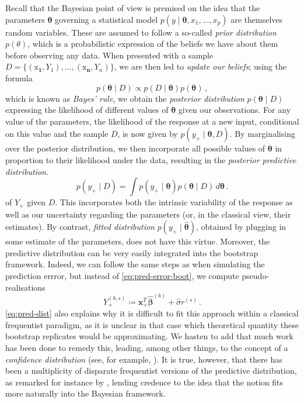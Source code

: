 \documentclass[a4paper]{book}
\begin{document}
Recall that the Bayesian point of view is premised on the idea that the parameters $\bm{\theta}$ governing a statistical model $p(y \mid \bm{\theta}, x_1, \dots, x_p)$ are themselves random variables. These are assumed to follow a so-called \emph{prior distribution} $p(\theta)$, which is a probabilistic expression of the beliefs we have about them before observing any data. When presented with a sample $D = \{ (\bm{\mathrm{x}_1}, Y_1), \dots, (\bm{\mathrm{x}_n}, Y_n) \}$, we are then led to \emph{update our beliefs}; using the formula
\begin{equation}
  p(\bm{\theta} \mid D) \propto p(D \mid \bm{\theta}) p(\bm{\theta}) \,,
\end{equation}
which is known as \emph{Bayes' rule}, we obtain the \emph{posterior distribution} $p(\bm{\theta} \mid D)$ expressing the likelihood of different values of $\bm{\theta}$ given our observations. For any value of the parameters, the likelihood of the response at a new input, conditional on this value and the sample $D$, is now given by $p(y_+ \mid \bm{\theta}, D)$. By marginalising over the posterior distribution, we then incorporate all possible values of $\bm{\theta}$ in proportion to their likelihood under the data, resulting in the \emph{posterior predictive distribution}.
\begin{equation}
  p(y_+ \mid D) = \int p(y_+ \mid \bm{\theta}) p(\bm{\theta} \mid D) \, d \bm{\theta} \,.
\end{equation}
of $Y_+$ given $D$. This incorporates both the intrinsic variability of the response as well as our uncertainty regarding the parameters (or, in the classical view, their estimates). By contrast, \emph{fitted distribution} $p(y_+ \mid \widehat{\bm{\theta}})$, obtained by plugging in some estimate of the parameters, does not have this virtue. Moreover, the predictive distribution can be very easily integrated into the bootstrap framework. Indeed, we can follow the same steps as when simulating the prediction errror, but instead of \cref{eq:pred-error-boot}, we compute pseudo-realisations
\begin{equation} \label{eq:pred-dist}
  Y_+^{(b, s)} \coloneqq \mathbf{x}_+^T \widehat{\bm{\beta}}^{(b)} + \widehat{\sigma} r^{(s)} \,.
\end{equation}
\cref{eq:pred-dist} also explains why it is difficult to fit this approach within a classical frequentist paradigm, as it is unclear in that case which theoretical quantity these bootstrap replicates would be approximating. We hasten to add that much work has been done to remedy this, leading, among other things, to the concept of a \emph{confidence distribution} (see, for example, \cites{barndorff-nielsen,lawless}). It is true, however, that there has been a multiplicity of disparate frequentist versions of the predictive distribution, as remarked for instance by \textcite{dickson}, lending credence to the idea that the notion fits more naturally into the Bayesian framework.
\end{document}
